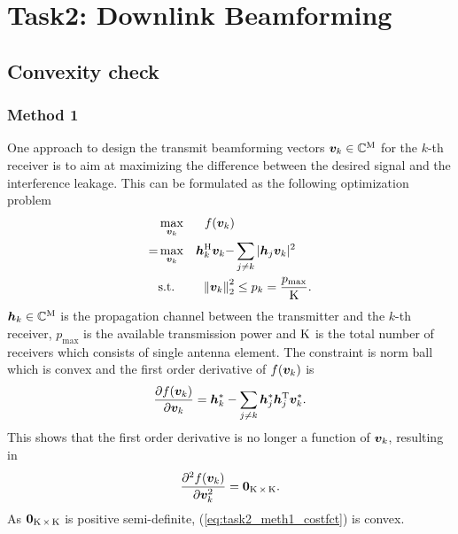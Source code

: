 \documentclass[10pt,a4paper]{article}
\begin{document}
\clearpage

\section{Task2: Downlink Beamforming}
\subsection{Convexity check}
\subsubsection*{Method 1}
One approach to design the transmit beamforming vectors $\bm{v}_k \in {\mathbb{C}}^{\operatorname{M}}$ for the $k$-th receiver is to aim at maximizing the difference between the desired signal and the interference leakage. This can be formulated as the following optimization problem 
\begin{equation} \label{eq:task2_meth1_costfct}
\begin{aligned}
  &  \max_{\bm{v}_k} & f (\bm{v}_{k}) & \\
=  & \max_{\bm{v}_k} & \bm{h}_{k}^{\operatorname{H}} \bm{v}_k  - & \sum_{j \neq k} \vert \bm{h}_{j} \bm{v}_{k} \vert^{2} \\
  & \text{s.t.} & \left\lVert\bm{v}_{k}\right\rVert_{2}^{2} & \leq p_k = \frac{p_{\max}}{\operatorname{K}} .
\end{aligned}
\end{equation}
$\bm{h}_{k} \in {\mathbb{C}}^{\operatorname{M}}$ is the propagation channel between the transmitter and the $k$-th receiver, $p_{\max}$ is the available transmission power and $\operatorname{K}$ is the total number of receivers which consists of single antenna element. The constraint is norm ball which is convex and the first order derivative of $f (\bm{v}_{k})$ is
\begin{equation}
\frac{\partial f (\bm{v}_{k})}{\partial \bm{v}_{k}} = \bm{h}_{k}^{*} - \sum_{j \neq k} \bm{h}_{j}^{*} \bm{h}_{j}^{\operatorname{T}}  \bm{v}_{k}^{*}.
\end{equation}
This shows that the first order derivative is no longer a function of $\bm{v}_{k}$, resulting in 
\begin{equation}
\frac{\partial^{2} f (\bm{v}_{k})}{\partial \bm{v}_{k}^{2}} = \bm{0}_{\operatorname{K} \times \operatorname{K}}.
\end{equation}
As $\bm{0}_{\operatorname{K} \times \operatorname{K}}$ is positive semi-definite, (\ref{eq:task2_meth1_costfct}) is convex.
\end{document}
